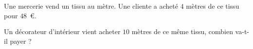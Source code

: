 
Une mercerie vend un tissu au mètre. Une cliente a acheté $4$ mètres de ce tissu pour $48$~€.

Un décorateur d'intérieur vient acheter $10$ mètres de ce même tissu, combien va-t-il payer ?

\smallskip
{}
